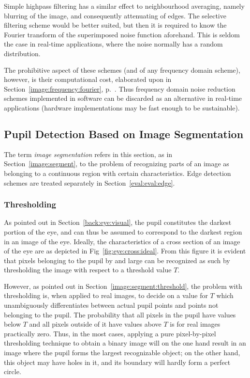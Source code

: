 Simple highpass filtering has a similar effect to neighbourhood
averaging, namely blurring of the image, and consequently attenuating
of edges.  The selective filtering scheme would be better suited, but
then it is required to know the Fourier transform of the superimposed
noise function aforehand.  This is seldom the case in real-time
applications, where the noise normally has a random distribution.

The prohibitive aspect of these schemes (and of any frequency domain
scheme), however, is their computational cost, elaborated upon in
Section~\ref{image:frequency:fourier}, p.~\pageref{pg:fft:O}.  Thus
frequency domain noise reduction schemes implemented in software can
be discarded as an alternative in real-time applications (hardware
implementations may be fast enough to be sustainable).

\subsection{Pupil Detection Based on Image Segmentation}
\label{eval:eval:segment}

The term {\em image segmentation\/} refers in this section, as in
Section~\ref{image:segment}, to the problem of recognizing parts of an
image as belonging to a continuous region with certain
characteristics.  Edge detection schemes are treated separately in
Section~\ref{eval:eval:edge}.

\subsubsection{Thresholding}

As pointed out in Section~\ref{back:eye:visual}, the pupil constitutes
the darkest portion of the eye, and can thus be assumed to correspond
to the darkest region in an image of the eye.  Ideally, the
characteristics of a cross section of an image of the eye are as
depicted in Fig~\ref{fig:eye:cross:ideal}.  From this figure it is
evident that pixels belonging to the pupil by and large can be
recognized as such by thresholding the image with respect to a
threshold value $T$.


However, as pointed out in Section~\ref{image:segment:threshold}, the
problem with thresholding is, when applied to real images, to decide
on a value for $T$ which unambiguously differentiates between actual
pupil points and points not belonging to the pupil.  The probability
that all pixels in the pupil have values below $T$ and all pixels
outside of it have values above $T$ is for real images practically
zero.  Thus, in the most cases, applying a pure pixel-by-pixel
thresholding technique to obtain a binary image will on the one hand
result in an image where the pupil forms the largest recognizable
object; on the other hand, this object may have holes in it, and its
boundary will hardly form a perfect circle.

